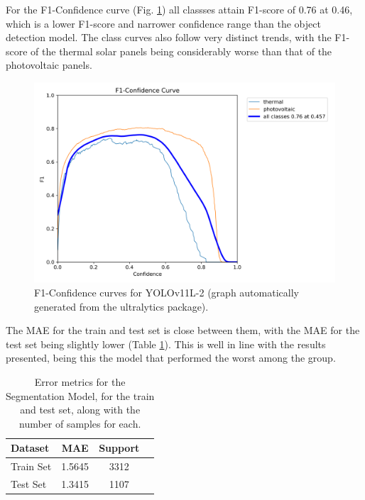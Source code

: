 \documentclass[conference]{IEEEtran}
\begin{document}
For the F1-Confidence curve (Fig. \ref{fig:model02_yolof1}) all classses attain F1-score of 0.76 at 0.46, which is a lower F1-score and narrower confidence range than the object detection model. The class curves also follow very distinct trends, with the F1-score of the thermal solar panels being considerably worse than that of the photovoltaic panels.

\begin{figure}[H]
    \centering
    \includegraphics[width=1\linewidth]{assets/model02_yolof1.png}
    \caption{F1-Confidence curves for YOLOv11L-2 (graph automatically generated from the ultralytics package).}
    \label{fig:model02_yolof1}
\end{figure}

The MAE for the train and test set is close between them, with the MAE for the test set being slightly lower (Table \ref{tab:model02_results}). This is well in line with the results presented, being this the model that performed the worst among the group.

\begin{table}[H]
\centering
\caption{Error metrics for the Segmentation Model, for the train and test set, along with the number of samples for each.}
\label{tab:model02_results}
\begin{tabular}{lccc}
\toprule
\textbf{Dataset} & \textbf{MAE} & \textbf{Support} \\
\midrule
Train Set & 1.5645 & 3312 \\
Test Set & 1.3415 & 1107 \\
\bottomrule
\end{tabular}
\end{table}


\newpage
\end{document}
